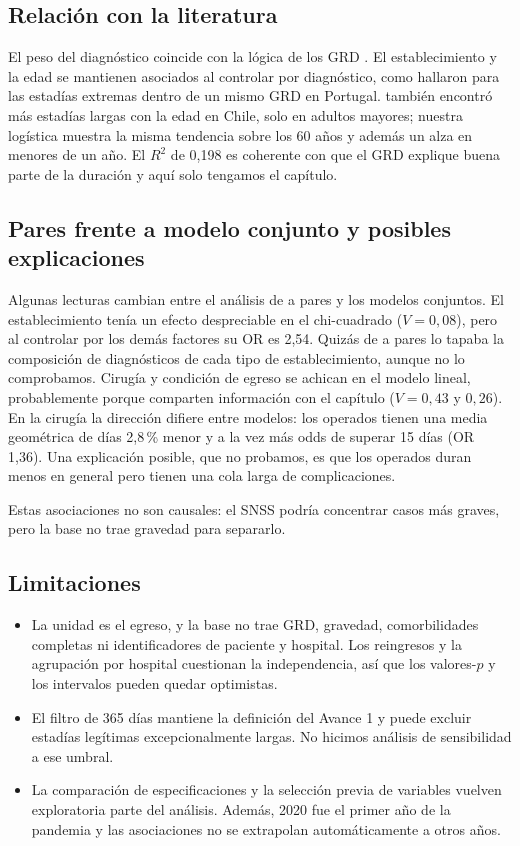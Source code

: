 \documentclass[10.5pt,a4paper,headings=small,abstract=false,bibliography=totoc,listof=totoc]{scrartcl}
\newcommand{\pct}{\,\%}
\begin{document}
\subsection{Relación con la literatura}

El peso del diagnóstico coincide con la lógica de los GRD \citep{fetter1980}. El establecimiento y la edad se mantienen asociados al controlar por diagnóstico, como hallaron \citet{freitas2012} para las estadías extremas dentro de un mismo GRD en Portugal. \citet{olivares2020} también encontró más estadías largas con la edad en Chile, solo en adultos mayores; nuestra logística muestra la misma tendencia sobre los 60 años y además un alza en menores de un año. El $R^2$ de 0,198 es coherente con que el GRD explique buena parte de la duración y aquí solo tengamos el capítulo.

\subsection{Pares frente a modelo conjunto y posibles explicaciones}

Algunas lecturas cambian entre el análisis de a pares y los modelos conjuntos. El establecimiento tenía un efecto despreciable en el chi-cuadrado ($V=0{,}08$), pero al controlar por los demás factores su OR es 2,54. Quizás de a pares lo tapaba la composición de diagnósticos de cada tipo de establecimiento, aunque no lo comprobamos. Cirugía y condición de egreso se achican en el modelo lineal, probablemente porque comparten información con el capítulo ($V=0{,}43$ y $0{,}26$). En la cirugía la dirección difiere entre modelos: los operados tienen una media geométrica de días 2,8\pct{} menor y a la vez más odds de superar 15 días (OR 1,36). Una explicación posible, que no probamos, es que los operados duran menos en general pero tienen una cola larga de complicaciones.

Estas asociaciones no son causales: el SNSS podría concentrar casos más graves, pero la base no trae gravedad para separarlo.

\subsection{Limitaciones}

\begin{itemize}\setlength\itemsep{0pt}
\item La unidad es el egreso, y la base no trae GRD, gravedad, comorbilidades completas ni identificadores de paciente y hospital. Los reingresos y la agrupación por hospital cuestionan la independencia, así que los valores-$p$ y los intervalos pueden quedar optimistas.
\item El filtro de 365 días mantiene la definición del Avance 1 y puede excluir estadías legítimas excepcionalmente largas. No hicimos análisis de sensibilidad a ese umbral.
\item La comparación de especificaciones y la selección previa de variables vuelven exploratoria parte del análisis. Además, 2020 fue el primer año de la pandemia y las asociaciones no se extrapolan automáticamente a otros años.
\end{itemize}
\end{document}
